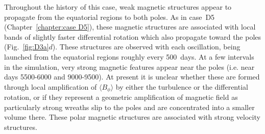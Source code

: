 Throughout the history of this case, weak magnetic structures appear
to propagate from the equatorial regions to both poles.  As in case~D5
(Chapter~\ref{chapter:case D5}), these magnetic structures are
associated with local bands of slightly faster differential rotation
which also propagate toward the poles (Fig.~\ref{fig:D3a}$d$).  
These structures are observed
with each oscillation, being launched from the equatorial regions
roughly every 500~days.  At a few intervals in the simulation, very strong
magnetic features appear near the poles (i.e. near days 5500-6000 and
9000-9500).  At present it is unclear whether these are formed through
local amplification of $\langle B_\phi \rangle$ by either the turbulence or the
differential rotation, or if they represent a geometric amplification
of magnetic field as particularly strong wreaths slip to the poles
and are concentrated into a smaller volume there.  These polar
magnetic structures are associated with strong velocity structures.


